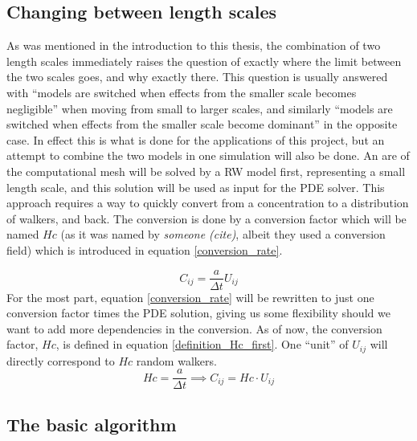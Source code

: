 \subsection{Changing between length scales}
As was mentioned in the introduction to this thesis, the combination of two length scales immediately raises the question of exactly where the limit between the two scales goes, and why exactly there. 
This question is usually answered with ``models are switched when effects from the smaller scale becomes negligible'' when moving from small to larger scales, and similarly ``models are switched when effects from the smaller scale become dominant'' in the opposite case. 
In effect this is what is done for the applications of this project, but an attempt to combine the two models in one simulation will also be done. 
An are of the computational mesh will be solved by a RW model first, representing a small length scale, and this solution will be used as input for the PDE solver. 
This approach requires a way to quickly convert from a concentration to a distribution of walkers, and back. 
The conversion is done by a conversion factor which will be named $Hc$ (as it was named by \emph{someone (cite)}, albeit they used a conversion field) which is introduced in equation \eqref{conversion_rate}. 

\begin{equation}\label{conversion_rate}
 C_{ij} = \frac{a}{\Delta t}U_{ij}
\end{equation}
For the most part, equation \eqref{conversion_rate}  will be rewritten to just one conversion factor times the PDE solution, giving us some flexibility should we want to add more dependencies in the conversion. 
As of now, the conversion factor, $Hc$, is defined in equation \eqref{definition_Hc_first}. 
One ``unit'' of $ U_{ij}$ will directly correspond to $Hc$ random walkers.
\begin{equation}\label{definition_Hc_first}
 Hc =  \frac{a}{\Delta t} \implies C_{ij} = Hc\cdot U_{ij}
\end{equation}

\subsection{The basic algorithm}\label{basic_algorithm}

